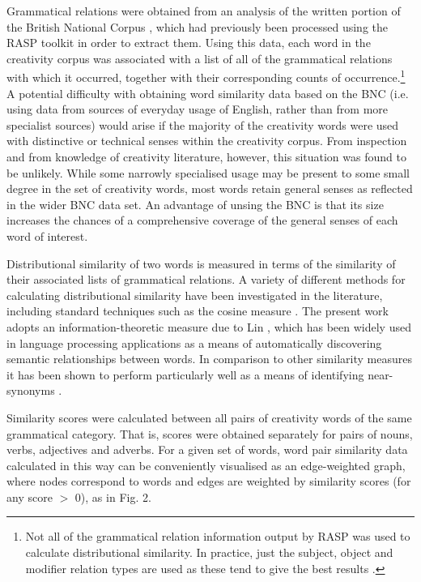 \documentclass[10pt,letterpaper]{article}
\begin{document}
\noindent
Grammatical relations were obtained from an analysis of the written portion of the British National Corpus \cite{leech92}, which had previously been processed using the RASP toolkit \cite{briscoe06} in order to extract them. Using this data, each word in the creativity corpus was associated with a list of all of the grammatical relations with which it occurred, together with their corresponding counts of occurrence.\footnote{Not all of the grammatical relation information output by RASP was used to calculate distributional similarity. In practice, just the subject, object and modifier relation types are used as these tend to give the best results \cite{weeds03}.} A potential difficulty with obtaining word similarity data based on the BNC (i.e. using data from sources of everyday usage of English, rather than from more specialist sources) would arise if the majority of the creativity words were used with distinctive or technical senses within the creativity corpus. From inspection and from knowledge of creativity literature, however, this situation was found to be unlikely. While some narrowly specialised usage may be present to some small degree in the set of creativity words, most words retain general senses as reflected in the wider BNC data set. An advantage of unsing the BNC is that its  size increases the chances of a comprehensive coverage of the general senses of each word of interest.

Distributional similarity of two words is measured in terms of the similarity of their associated lists of grammatical relations. A variety of different methods for calculating distributional similarity have been investigated in the literature, including standard techniques such as the cosine measure \cite[for example]{mannschu99}. The present work adopts an information-theoretic measure due to Lin \cite{lin98}, which has been widely used in language processing applications as a means of automatically discovering semantic relationships between words. In comparison to other similarity measures it has been shown to perform particularly well as a means of identifying near-synonyms \cite{weedsweir03,mccanavi09}.

Similarity scores were calculated between all pairs of creativity words of the same grammatical category. That is, scores were obtained separately for pairs of nouns, verbs, adjectives and adverbs. For a given set of words, word pair similarity data calculated in this way can be conveniently visualised as an edge-weighted graph, where nodes  correspond to words and edges are weighted by similarity scores (for any score $>$ 0), as in Fig. 2. %
\end{document}
